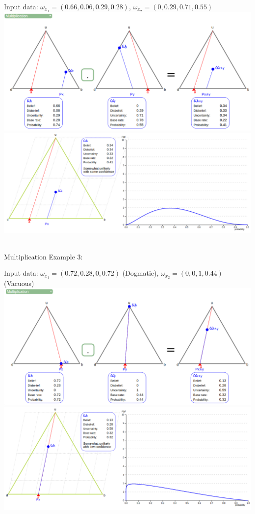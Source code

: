 \documentclass[UTF8]{article}
\newcommand{\opinion}[5]{$\omega_{#1} = (#2, #3, #4, #5)$}
\begin{document}
    \begin{center}
        Input data: 
        \opinion{x_1}{0.66}{0.06}{0.29}{0.28}, 
        \opinion{x_2}{0}{0.29}{0.71}{0.55}\\
        \includegraphics[width=6in]{images/mul2.png}
        \includegraphics[width=6in]{images/mul2viz.png}
    \end{center}
    \hrulefill\\
Multiplication Example 3:
    \begin{center}
        Input data: 
        \opinion{x_1}{0.72}{0.28}{0}{0.72} (Dogmatic), 
        \opinion{x_2}{0}{0}{1}{0.44} (Vacuous)\\
        \includegraphics[width=6in]{images/mul3.png}
        \includegraphics[width=6in]{images/mul3viz.png}
\end{center}
\end{document}
